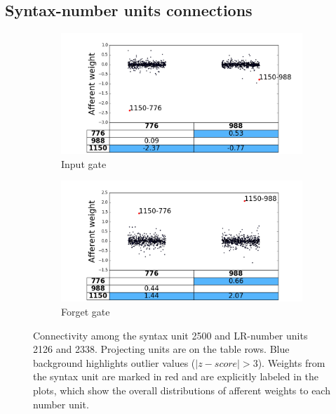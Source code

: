 \subsection{Syntax-number units connections}

\begin{figure}[t]
    \centering
    \begin{subfigure}{0.49\textwidth}
            \centering
            \includegraphics[width=\textwidth]{Figures/gate_Input_afferent_interactions.png}
            \caption{Input gate}
            \label{fig:interaction-input}
    \end{subfigure}
    \begin{subfigure}{0.49\textwidth}
           \centering
          \includegraphics[width=\textwidth]{Figures/gate_Forget_afferent_interactions.png}
          \caption{Forget gate}
          \label{fig:interaction-forget}
    \end{subfigure}
    \caption{Connectivity among the syntax unit \unit{2}{500} and
      LR-number units \unit{2}{126} and \unit{2}{338}. Projecting
      units are on the table rows. Blue background highlights outlier
      values ($|z-score|>3$). Weights from the syntax unit are marked in red
      and are explicitly labeled in the plots, which show the overall distributions of afferent weights to each number unit.}
\label{fig:interaction}
\end{figure}

